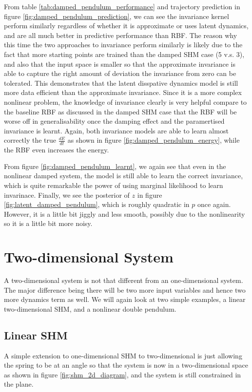 \documentclass{statsmsc}
\begin{document}
From table \ref{tab:damped_pendulum_performance} and trajectory prediction in figure \ref{fig:damped_pendulum_prediction}, we can see the invariance kernel perform similarly regardless of whether it is approximate or uses latent dynamics, and are all much better in predictive performance than RBF.
The reason why this time the two approaches to invariance perform similarly is likely due to the fact that more starting points are trained than the damped SHM case (5 v.s. 3), and also that the input space is smaller so that the approximate invariance is able to capture the right amount of deviation the invariance from zero can be tolerated.
This demonstrates that the latent disspative dynamics model is still more data efficient than the approximate invariance.
Since it is a more complex nonlinear problem, the knowledge of invariance clearly is very helpful compare to the baseline RBF as discussed in the damped SHM case that the RBF will be worse off in generalisability once the damping effect and the paramertised invariance is learnt.
Again, both invariance models are able to learn almost correctly the true $\frac{dE}{dt}$ as shown in figure \ref{fig:damped_pendulum_energy}, while the RBF even increases the energy.

From figure \ref{fig:damped_pendulum_learnt}, we again see that even in the nonlinear damped system, the model is still able to learn the correct invariance, which is quite remarkable the power of using marginal likelihood to learn invarinace. 
Finally, we see the posterior of $z$ in figure \ref{fig:latent_damped_pendulum}, which is roughly quadratic in $p$ once again. 
However, it is a little bit jiggly and less smooth, possibly due to the nonlinearity so it is a little bit more noisy.


\section{Two-dimensional System}
A two-dimensional system is not that different from an one-dimensional system. The major difference being there will be two more input variables and hence two more dynamics term as well. 
We will again look at two simple examples, a linear two-dimensional SHM, and a nonlinear double pendulum.

\subsection{Linear SHM}
A simple extension to one-dimensional SHM to two-dimensional is just allowing the spring to be at an angle so that the system is now in a two-dimensional space as shown in figure \ref{fig:shm_2d_diagram}, and the system is still constrained in the plane.
\end{document}
